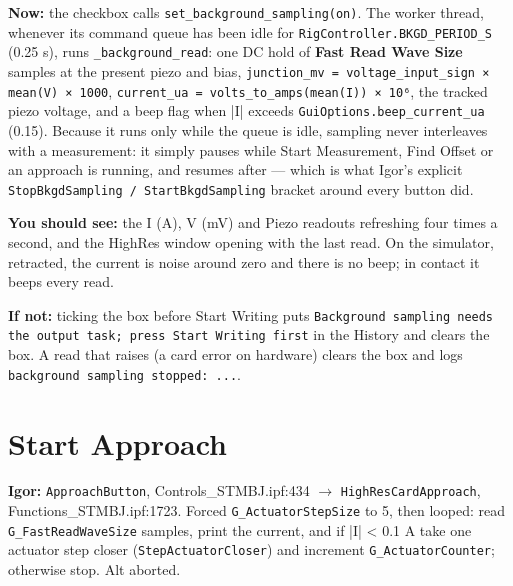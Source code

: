 \textbf{Now:} the checkbox calls \texttt{set\_\discretionary{}{}{}background\_\discretionary{}{}{}sampling(on)}. The worker thread, whenever its command queue has been idle for \texttt{Rig\discretionary{}{}{}Controller.\discretionary{}{}{}BKGD\_\discretionary{}{}{}PERIOD\_\discretionary{}{}{}S} (0.25 s), runs \texttt{\_\discretionary{}{}{}background\_\discretionary{}{}{}read}: one DC hold of \textbf{Fast Read Wave Size} samples at the present piezo and bias, \texttt{junction\_\discretionary{}{}{}mv = voltage\_\discretionary{}{}{}input\_\discretionary{}{}{}sign × mean(V) × 1000}, \texttt{current\_\discretionary{}{}{}ua = volts\_\discretionary{}{}{}to\_\discretionary{}{}{}amps(mean(I)) × 10⁶}, the tracked piezo voltage, and a beep flag when |I| exceeds \texttt{Gui\discretionary{}{}{}Options.\discretionary{}{}{}beep\_\discretionary{}{}{}current\_\discretionary{}{}{}ua} (0.15). Because it runs only while the queue is idle, sampling never interleaves with a measurement: it simply pauses while Start Measurement, Find Offset or an approach is running, and resumes after --- which is what Igor's explicit \texttt{Stop\discretionary{}{}{}Bkgd\discretionary{}{}{}Sampling /\discretionary{}{}{} Start\discretionary{}{}{}Bkgd\discretionary{}{}{}Sampling} bracket around every button did.

\textbf{You should see:} the I (\textmu{}A), V (mV) and Piezo readouts refreshing four times a second, and the HighRes window opening with the last read. On the simulator, retracted, the current is noise around zero and there is no beep; in contact it beeps every read.

\textbf{If not:} ticking the box before Start Writing puts \texttt{Background sampling needs the output task; press Start Writing first} in the History and clears the box. A read that raises (a card error on hardware) clears the box and logs \texttt{background sampling stopped: .\discretionary{}{}{}.\discretionary{}{}{}.\discretionary{}{}{}}.

\section{Start Approach}

\textbf{Igor:} \texttt{Approach\discretionary{}{}{}Button}, Controls\_STMBJ.ipf:434 $\rightarrow$ \texttt{High\discretionary{}{}{}Res\discretionary{}{}{}Card\discretionary{}{}{}Approach}, Functions\_STMBJ.ipf:1723. Forced \texttt{G\_\discretionary{}{}{}Actuator\discretionary{}{}{}Step\discretionary{}{}{}Size} to 5, then looped: read \texttt{G\_\discretionary{}{}{}Fast\discretionary{}{}{}Read\discretionary{}{}{}Wave\discretionary{}{}{}Size} samples, print the current, and if |I| < 0.1 \textmu{}A take one actuator step closer (\texttt{Step\discretionary{}{}{}Actuator\discretionary{}{}{}Closer}) and increment \texttt{G\_\discretionary{}{}{}Actuator\discretionary{}{}{}Counter}; otherwise stop. Alt aborted.

